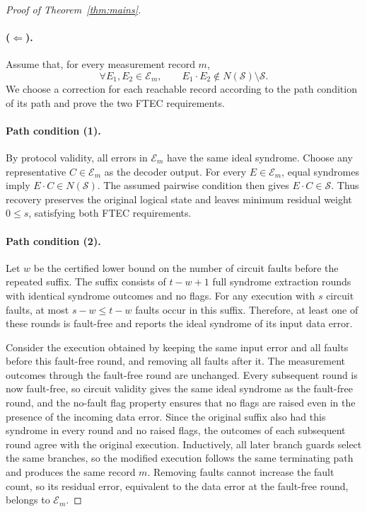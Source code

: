 \documentclass[acmsmall,screen,review,anonymous,nonacm]{acmart}
\newcommand{\cS}{\mathcal{S}}
\begin{document}
\begin{proof}[Proof of Theorem~\ref{thm:mains}]
\paragraph{($\Leftarrow$).}
Assume that, for every measurement record $m$,
\[
 \forall E_1,E_2\in\mathcal E_m,\qquad
 E_1\cdot E_2\notin N(\cS)\setminus\cS.
\]
We choose a correction for each reachable record according to the
path condition of its path and prove the two FTEC requirements.

\paragraph{Path condition (1).}
By protocol validity, all errors in $\mathcal E_m$ have the same
ideal syndrome. Choose any representative $C\in\mathcal E_m$ as the
decoder output. For every $E\in\mathcal E_m$, equal syndromes imply
$E\cdot C\in N(\cS)$. The assumed pairwise condition then gives
$E\cdot C\in\cS$. Thus recovery preserves the original logical state
and leaves minimum residual weight $0\le s$, satisfying both FTEC
requirements.

\paragraph{Path condition (2).}
Let $w$ be the certified lower bound on the number of circuit faults
before the repeated suffix. The suffix consists of $t-w+1$ full syndrome
extraction rounds with identical syndrome outcomes and no flags.
For any execution with $s$ circuit faults, at most $s-w\le t-w$
faults occur in this suffix. Therefore, at least one of these rounds is
fault-free and reports the ideal syndrome of its input data error.

Consider the execution obtained by keeping the same input error and all
faults before this fault-free round, and removing all faults after it.
The measurement outcomes through the fault-free round are unchanged.
Every subsequent round is now fault-free, so circuit validity gives
the same ideal syndrome as the fault-free round, and the no-fault
flag property ensures that no flags are raised even in the presence
of the incoming data error. Since the original suffix also had this
syndrome in every round and no raised flags, the outcomes of each
subsequent round agree with the original execution. Inductively, all
later branch guards select the same branches, so the modified execution
follows the same terminating path and produces the same record $m$.
Removing faults cannot increase the fault count, so its residual
error, equivalent to the data error at the fault-free round, belongs
to $\mathcal E_m$.


\end{proof}
\end{document}
